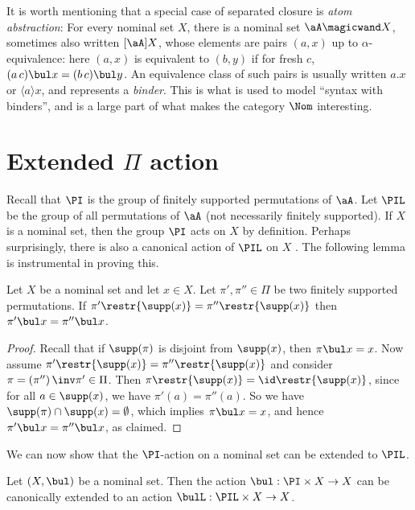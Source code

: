 \documentclass[twoside,11pt]{entics}
\begin{document}
It is worth mentioning that a special case of separated closure is
\emph{atom abstraction}: For every nominal set $X$, there is a nominal
set $\aA\magicwand X$, sometimes also written $[\aA]X$, whose elements
are pairs $(a,x)$ up to $\alpha$-equivalence: here $(a,x)$ is
equivalent to $(b,y)$ if for fresh $c$, $(a\,c)\bul x = (b\,c)\bul y$.
An equivalence class of such pairs is usually written $a.x$ or
$\langle a\rangle x$, and represents a \emph{binder}. This is what is
used to model ``syntax with binders'', and is a large part of what
makes the category $\Nom$ interesting.

\section{Extended $\Pi$ action}
\label{sec:large-action}

Recall that $\PI$ is the group of finitely supported permutations of
$\aA$. Let $\PIL$ be the group of all permutations of $\aA$ (not
necessarily finitely supported). If $X$ is a nominal set, then the
group $\PI$ acts on $X$ by definition. Perhaps surprisingly, there is
also a canonical action of $\PIL$ on $X$ \cite{Gadducci2006,milius2016}. The following lemma is
instrumental in proving this.

\begin{xlem}\label{LemSuppAct}
  Let $X$ be a nominal set and let $x\in X$. Let $\pi' ,\pi'' \in \Pi$
  be two finitely supported permutations. If
  $\pi'\restr{\supp(x)}=\pi''\restr{\supp(x)}$ then $\pi' \bul x = \pi''
  \bul x$.
\end{xlem}

\begin{proof}
  Recall that if $\supp(\pi)$ is disjoint from $\supp(x)$, then
  $\pi\bul x = x$.  Now assume
  $\pi'\restr{\supp(x)}=\pi''\restr{\supp(x)}$ and consider
  $\pi=\left( \pi''\right)\inv \pi'\in \Pi$. Then
  $\pi\restr{\supp(x)}=\id\restr{\supp(x)}$, since for all $a\in
  \supp(x)$, we have $\pi'(a)=\pi''(a)$. So we have $\supp(\pi)\cap
  \supp(x)=\emptyset$, which implies $\pi\bul x=x$, and hence
  $\pi'\bul x=\pi''\bul x$, as claimed.
\end{proof}

We can now show that the $\PI$-action on a nominal set can be
extended to $\PIL$.

\begin{xprop}\label{prop:pi-extension}
  Let $(X,\bul)$ be a nominal set. Then the action
  $\bul:\PI\times X \to X$ can be canonically extended to
  an action $\bulL:\PIL\times X \to X$.
\end{xprop} 
\end{document}
